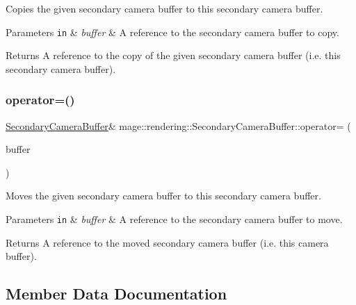 Copies the given secondary camera buffer to this secondary camera buffer.


\begin{DoxyParams}[1]{Parameters}
\mbox{\tt in}  & {\em buffer} & A reference to the secondary camera buffer to copy. \\
\hline
\end{DoxyParams}
\begin{DoxyReturn}{Returns}
A reference to the copy of the given secondary camera buffer (i.\+e. this secondary camera buffer). 
\end{DoxyReturn}
\hypertarget{structmage_1_1rendering_1_1_secondary_camera_buffer_ae559ef0e3a2c5e01963fa744a427cdc7}{}\label{structmage_1_1rendering_1_1_secondary_camera_buffer_ae559ef0e3a2c5e01963fa744a427cdc7} 
\subsubsection{\texorpdfstring{operator=()}{operator=()}\hspace{0.1cm}{\footnotesize\ttfamily [2/2]}}
{\footnotesize\ttfamily \hyperlink{structmage_1_1rendering_1_1_secondary_camera_buffer}{Secondary\+Camera\+Buffer}\& mage\+::rendering\+::\+Secondary\+Camera\+Buffer\+::operator= (\begin{DoxyParamCaption}\item[{\hyperlink{structmage_1_1rendering_1_1_secondary_camera_buffer}{Secondary\+Camera\+Buffer} \&\&}]{buffer }\end{DoxyParamCaption})\hspace{0.3cm}{\ttfamily [default]}}

Moves the given secondary camera buffer to this secondary camera buffer.


\begin{DoxyParams}[1]{Parameters}
\mbox{\tt in}  & {\em buffer} & A reference to the secondary camera buffer to move. \\
\hline
\end{DoxyParams}
\begin{DoxyReturn}{Returns}
A reference to the moved secondary camera buffer (i.\+e. this camera buffer). 
\end{DoxyReturn}


\subsection{Member Data Documentation}
\hypertarget{structmage_1_1rendering_1_1_secondary_camera_buffer_a05e3f20005a72a77017ecb76f683efdd}{}\label{structmage_1_1rendering_1_1_secondary_camera_buffer_a05e3f20005a72a77017ecb76f683efdd} 
